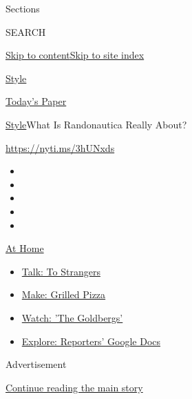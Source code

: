 Sections

SEARCH

\protect\hyperlink{site-content}{Skip to
content}\protect\hyperlink{site-index}{Skip to site index}

\href{https://www.nytimes.com/section/style}{Style}

\href{https://myaccount.nytimes.com/auth/login?response_type=cookie\&client_id=vi}{}

\href{https://www.nytimes.com/section/todayspaper}{Today's Paper}

\href{/section/style}{Style}\textbar{}What Is Randonautica Really About?

\url{https://nyti.ms/3hUNxds}

\begin{itemize}
\item
\item
\item
\item
\item
\end{itemize}

\href{https://www.nytimes.com/spotlight/at-home?action=click\&pgtype=Article\&state=default\&region=TOP_BANNER\&context=at_home_menu}{At
Home}

\begin{itemize}
\tightlist
\item
  \href{https://www.nytimes.com/2020/08/03/well/family/the-benefits-of-talking-to-strangers.html?action=click\&pgtype=Article\&state=default\&region=TOP_BANNER\&context=at_home_menu}{Talk:
  To Strangers}
\item
  \href{https://www.nytimes.com/2020/08/01/at-home/coronavirus-make-pizza-on-a-grill.html?action=click\&pgtype=Article\&state=default\&region=TOP_BANNER\&context=at_home_menu}{Make:
  Grilled Pizza}
\item
  \href{https://www.nytimes.com/2020/07/31/arts/television/goldbergs-abc-stream.html?action=click\&pgtype=Article\&state=default\&region=TOP_BANNER\&context=at_home_menu}{Watch:
  'The Goldbergs'}
\item
  \href{https://www.nytimes.com/interactive/2020/at-home/even-more-reporters-editors-diaries-lists-recommendations.html?action=click\&pgtype=Article\&state=default\&region=TOP_BANNER\&context=at_home_menu}{Explore:
  Reporters' Google Docs}
\end{itemize}

Advertisement

\protect\hyperlink{after-top}{Continue reading the main story}

